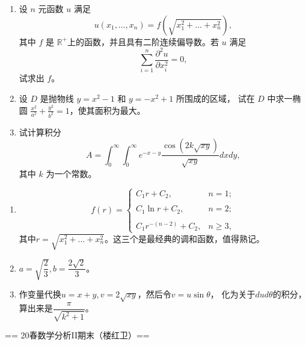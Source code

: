 \begin{enumerate}
(i) 对于任意固定的 $(x, y) \in \mathbb{R}^{2}$ 存在极限
\[\lim_{t \rightarrow 0+} \frac{f(tx, ty)-f(0,0)}{t}=g(x, y);\]
(ii) 对于任意的 $\alpha, \beta \in \mathbb{R}$ 以及 $(x_{1}, y_{1}),(x_{2}, y_{2}) \in \mathbb{R}^{2}$，有
\[g(\alpha x_{1}+\beta x_{2}, \alpha y_{1}+\beta y_{2})
=\alpha g(x_{1}, y_{1})+\beta g(x_{2}, y_{2});\]
(iii) 存在 $M>0$，使得对于任意的 $(x_{1}, y_{1}),(x_{2}, y_{2}) \in \mathbb{R}^{2}$，
\[|f(x_{1}, y_{1})-f(x_{2}, y_{2})| 
\leq M \sqrt{(x_{1}-y_{1})^{2}+(x_{2}-y_{2})^{2}}.\]
证明当 $\sqrt{x^{2}+y^{2}}$ 趋于 $0$ 时，有
\[f(x, y)=f(0,0)+g(x, y)+o(\sqrt{x^{2}+y^{2}}).\]
\item 设 $n$ 元函数 $u$ 满足
\[u\left(x_{1}, \ldots, x_{n}\right)=f\left(\sqrt{x_{1}^{2}+\ldots+x_{n}^{2}}\right),\]
其中 $f$ 是 $\mathbb{R}^{+}$上的函数，并且具有二阶连续偏导数。若 $u$ 满足
\[\sum_{i=1}^{n} \frac{\partial^{2} u}{\partial x_{i}^{2}}=0,\]
试求出 $f$。
\item 设 $D$ 是抛物线 $y=x^{2}-1$ 和 $y=-x^{2}+1$ 所围成的区域，
试在 $D$ 中求一椭圆 $\frac{x^{2}}{a^{2}}+\frac{y^{2}}{b^{2}}=1$，使其面积为最大。
\item 试计算积分
\[A=\int_{0}^{\infty} \int_{0}^{\infty} e^{-x-y} \frac{\cos (2k \sqrt{xy})}{\sqrt{xy}} dx dy,\]
其中 $k$ 为一个常数。
\end{enumerate}
\begin{proofc}[7,8,9 的答案]
\begin{enumerate}
\item \[f(r)=\begin{cases}C_1r+C_2,&n=1;\\ & \\
C_1\ln r+C_2,&n=2;\\ & \\C_1r^{-(n-2)}+C_2,&n \geqslant 3,\end{cases}\]
其中$r=\sqrt{x_1^2+\ldots+x_n^2}$。这三个是最经典的调和函数，值得熟记。
\item $a=\sqrt{\dfrac{2}{3}},b=\dfrac{2\sqrt{2}}{3}$。
\item 作变量代换$u=x+y,v=2\sqrt{xy}$，然后令$v=u\sin\theta$，
化为关于$dud\theta$的积分，算出来是$\dfrac{\pi}{\sqrt{k^2+1}}$。\qedhere
\end{enumerate}
\end{proofc}

== 20春数学分析II期末（楼红卫）==

